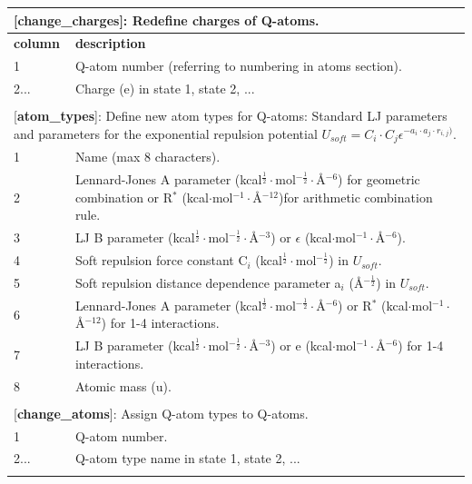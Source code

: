 \documentclass[10pt,oneside,pdftex]{article}
\begin{document}
\begin{longtable}{|p{53pt}|p{181pt}|p{160pt}|}
\multicolumn{3}{p{394pt}}{[\textbf{change\_charges}]: Redefine charges of Q-atoms.}\\
\hline \textbf{column} & \multicolumn{2}{p{341pt}|}{\textbf{description}}\\
\hline 1 & \multicolumn{2}{p{341pt}|}{Q-atom number (referring to numbering in atoms section).}\\
\hline 2... & \multicolumn{2}{p{341pt}|}{Charge (e) in state 1, state 2, ...}\\
\hline
\multicolumn{3}{p{394pt}}{}\\

\multicolumn{3}{p{394pt}}{[\textbf{atom\_types}]: Define new atom types for Q-atoms: Standard LJ parameters and parameters for the exponential repulsion potential $U_{soft} = C_i\cdot C_j\epsilon^{-a_i\cdot a_j\cdot r_{i,j})}$.}\\
\hline 1 & \multicolumn{2}{p{341pt}|}{Name (max 8 characters).}\\
\hline 2 & \multicolumn{2}{p{341pt}|}{Lennard-Jones A parameter (kcal$^{\frac{1}{2}}\cdot$mol$^{-\frac{1}{2}}\cdot${\AA}$^{-6}$) for geometric combination or R$^*$ (kcal$\cdot$mol$^{-1}\cdot${\AA}$^{-12}$)for arithmetic combination rule.}\\
\hline 3 & \multicolumn{2}{p{341pt}|}{LJ B parameter (kcal$^{\frac{1}{2}}\cdot$mol$^{-\frac{1}{2}}\cdot${\AA}$^{-3}$) or $\epsilon$ (kcal$\cdot$mol$^{-1}\cdot${\AA}$^{-6}$).}\\
\hline 4 & \multicolumn{2}{p{341pt}|}{Soft repulsion force constant C$_i$ (kcal$^{\frac{1}{2}}\cdot$mol$^{-\frac{1}{2}}$) in $U_{soft}$.}\\
\hline 5 & \multicolumn{2}{p{341pt}|}{Soft repulsion distance dependence parameter a$_i$ ({\AA}$^{-\frac{1}{2}}$) in $U_{soft}$.}\\
\hline 6 & \multicolumn{2}{p{341pt}|}{Lennard-Jones A parameter (kcal$^{\frac{1}{2}}\cdot$mol$^{-\frac{1}{2}}\cdot${\AA}$^{-6}$) or R$^*$ (kcal$\cdot$mol$^{-1}\cdot${\AA}$^{-12}$) for 1-4 interactions.}\\
\hline 7 & \multicolumn{2}{p{341pt}|}{LJ B parameter (kcal$^{\frac{1}{2}}\cdot$mol$^{-\frac{1}{2}}\cdot${\AA}$^{-3}$) or e (kcal$\cdot$mol$^{-1}\cdot${\AA}$^{-6}$) for 1-4 interactions.}\\
\hline 8 & \multicolumn{2}{p{341pt}|}{Atomic mass (u).}\\
\hline
\multicolumn{3}{p{394pt}}{}\\

\multicolumn{3}{p{394pt}}{[\textbf{change\_atoms}]: Assign Q-atom types to Q-atoms.}\\
\hline 1 & \multicolumn{2}{p{341pt}|}{Q-atom number.}\\
\hline 2... & \multicolumn{2}{p{341pt}|}{Q-atom type name in state 1, state 2, ...}\\
\hline
\multicolumn{3}{p{394pt}}{}\\


\end{longtable}
\end{document}
